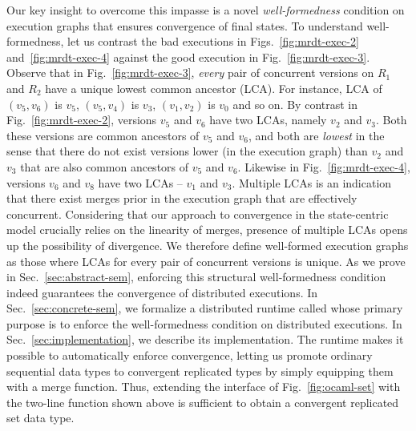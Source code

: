 Our key insight to overcome this impasse is a novel \emph{well-formedness}
condition on execution graphs that ensures convergence of final
states. To understand well-formedness, let us contrast the bad
executions in Figs.~\ref{fig:mrdt-exec-2} and~\ref{fig:mrdt-exec-4}
against the good execution in Fig.~\ref{fig:mrdt-exec-3}. Observe that
in Fig.~\ref{fig:mrdt-exec-3}, \emph{every} pair of concurrent
versions on $R_1$ and $R_2$ have a unique lowest common ancestor
(LCA). For instance, LCA of $(v_5,v_6)$ is $v_5$, $(v_5,v_4)$ is
$v_3$, $(v_1,v_2)$ is $v_0$ and so on. By contrast in
Fig.~\ref{fig:mrdt-exec-2}, versions $v_5$ and $v_6$ have two LCAs,
namely $v_2$ and $v_3$. Both these versions are common ancestors of
$v_5$ and $v_6$, and both are \emph{lowest} in the sense that there do
not exist versions lower (in the execution graph) than $v_2$ and $v_3$
that are also common ancestors of $v_5$ and $v_6$. Likewise in
Fig.~\ref{fig:mrdt-exec-4}, versions $v_6$ and $v_8$ have two LCAs --
$v_1$ and $v_3$. Multiple LCAs is an indication that there exist
merges prior in the execution graph that are effectively concurrent.
Considering that our approach to convergence in the state-centric
model crucially relies on the linearity of merges, presence of
multiple LCAs opens up the possibility of divergence. We therefore
define well-formed execution graphs as those where LCAs for every pair
of concurrent versions is unique. As we prove in
Sec.~\ref{sec:abstract-sem}, enforcing this structural well-formedness
condition indeed guarantees the convergence of distributed executions.
In Sec.~\ref{sec:concrete-sem}, we formalize a distributed runtime
called \quark whose primary purpose is to enforce the well-formedness
condition on distributed executions. In Sec.~\ref{sec:implementation},
we describe its implementation. The runtime makes it possible to
automatically enforce convergence, letting us promote ordinary
sequential data types to convergent replicated types by simply
equipping them with a merge function.  Thus, extending the 
interface of Fig.~\ref{fig:ocaml-set} with the two-line 
function shown above is sufficient to obtain a convergent replicated
set data type.

